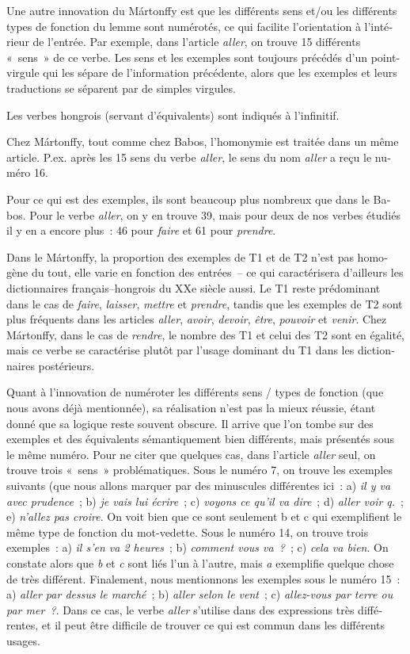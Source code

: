 \documentclass[output=paper,colorlinks,citecolor=brown,arabicfont,chinesefont,booklanguage=french]{langscibook}
\begin{document}
\begin{otherlanguage}{french}
Une autre innovation du Mártonffy est que les différents sens et/ou les différents types de fonction du lemme sont numérotés, ce qui facilite l’orientation à l’intérieur de l’entrée. Par exemple, dans l’article \emph{aller}, on trouve 15 différents «~sens~» de ce verbe. Les sens et les exemples sont toujours précédés d’un point-virgule qui les sépare de l’information précédente, alors que les exemples et leurs traductions se séparent par de simples virgules. 

Les verbes hongrois (servant d’équivalents) sont indiqués à l’infinitif.

Chez Mártonffy, tout comme chez Babos, l’homonymie est traitée dans un même article. P.ex. après les 15 sens du verbe \emph{aller}, le sens du nom \emph{aller} a reçu le numéro 16. 

Pour ce qui est des exemples, ils sont beaucoup plus nombreux que dans le Babos. Pour le verbe \emph{aller}, on y en trouve 39, mais pour deux de nos verbes étudiés il y en a encore plus~: 46 pour \emph{faire} et 61 pour \emph{prendre}.

Dans le Mártonffy, la proportion des exemples de T1 et de T2 n’est pas homogène du tout, elle varie en fonction des entrées~-- ce qui caractérisera d’ailleurs les dictionnaires français–hongrois du XXe siècle aussi. Le T1 reste prédominant dans le cas de \emph{faire}, \emph{laisser}, \emph{mettre} et \emph{prendre}, tandis que les exemples de T2 sont plus fréquents dans les articles \emph{aller}, \emph{avoir}, \emph{devoir}, \emph{être}, \emph{pouvoir} et \emph{venir}. Chez Mártonffy, dans le cas de \emph{rendre}, le nombre des T1 et celui des T2 sont en égalité, mais ce verbe se caractérise plutôt par l’usage dominant du T1 dans les dictionnaires postérieurs.

Quant à l’innovation de numéroter les différents sens / types de fonction (que nous avons déjà mentionnée), sa réalisation n’est pas la mieux réussie, étant donné que sa logique reste souvent obscure. Il arrive que l’on tombe sur des exemples et des équivalents sémantiquement bien différents, mais présentés sous le même numéro. Pour ne citer que quelques cas, dans l’article \emph{aller} seul, on trouve trois «~sens~» problématiques. Sous le numéro 7, on trouve les exemples suivants (que nous allons marquer par des minuscules différentes ici~: a) \emph{il y va avec prudence}~; b) \emph{je vais lui écrire}~; c) \emph{voyons ce qu’il va dire}~; d) \emph{aller voir q.}~; e) \emph{n’allez pas croire}. On voit bien que ce sont seulement b et c qui exemplifient le même type de fonction du mot-vedette. Sous le numéro 14, on trouve trois exemples~: a) \emph{il s’en va 2 heures}~; b) \emph{comment vous va~?}~; c) \emph{cela va bien}. On constate alors que \emph{b} et \emph{c} sont liés l’un à l’autre, mais \emph{a} exemplifie quelque chose de très différent. Finalement, nous mentionnons les exemples sous le numéro 15~: a) \emph{aller par dessus le marché}~; b) \emph{aller selon le vent}~; c) \emph{allez-vous par terre ou par mer~?}. Dans ce cas, le verbe \emph{aller} s’utilise dans des expressions très différentes, et il peut être difficile de trouver ce qui est commun dans les différents usages. 


\end{otherlanguage}
\end{document}
